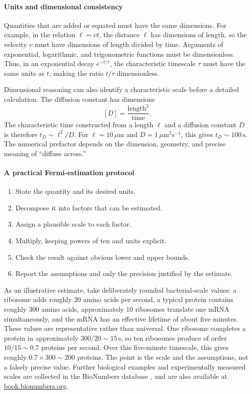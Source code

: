 \paragraph{Units and dimensional consistency}
Quantities that are added or equated must have the same dimensions.
For example, in the relation $\ell=vt$, the distance $\ell$ has dimensions of length, so the velocity $v$ must have dimensions of length divided by time.
Arguments of exponential, logarithmic, and trigonometric functions must be dimensionless.
Thus, in an exponential decay $e^{-t/\tau}$, the characteristic timescale $\tau$ must have the same units as $t$, making the ratio $t/\tau$ dimensionless.

Dimensional reasoning can also identify a characteristic scale before a detailed calculation.
The diffusion constant has dimensions
\[
    [D]=\frac{\text{length}^2}{\text{time}}.
\]
The characteristic time constructed from a length $\ell$ and a diffusion constant $D$ is therefore $t_D\sim\ell^2/D$.
For $\ell=10\,\mu\mathrm{m}$ and $D=1\,\mu\mathrm{m}^2\mathrm{s}^{-1}$, this gives $t_D\sim100\,\mathrm{s}$.
The numerical prefactor depends on the dimension, geometry, and precise meaning of ``diffuse across.''

\paragraph{A practical Fermi-estimation protocol}
\begin{enumerate}
    \item State the quantity and its desired units.
    \item Decompose it into factors that can be estimated.
    \item Assign a plausible scale to each factor.
    \item Multiply, keeping powers of ten and units explicit.
    \item Check the result against obvious lower and upper bounds.
    \item Report the assumptions and only the precision justified by the estimate.
\end{enumerate}

As an illustrative estimate, take deliberately rounded bacterial-scale values: a ribosome adds roughly $20$ amino acids per second, a typical protein contains roughly $300$ amino acids, approximately $10$ ribosomes translate one mRNA simultaneously, and the mRNA has an effective lifetime of about five minutes.
These values are representative rather than universal.
One ribosome completes a protein in approximately $300/20\sim15\,\mathrm{s}$, so ten ribosomes produce of order $10/15\sim0.7$ proteins per second.
Over this five-minute timescale, this gives roughly $0.7\times300\sim200$ proteins.
The point is the scale and the assumptions, not a falsely precise value.
Further biological examples and experimentally measured scales are collected in the BioNumbers database \cite{milo2010bionumbers}, and are also available at \href{https://book.bionumbers.org}{book.bionumbers.org}.


